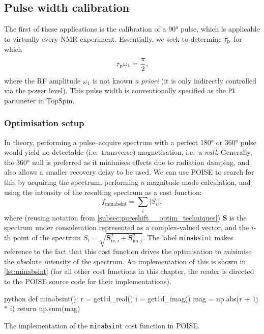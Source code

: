 \subsection{Pulse width calibration}
\label{subsec:poise__pulsecal}

The first of these applications is the calibration of a \ang{90} \proton{} pulse, which is applicable to virtually every NMR experiment.
Essentially, we seek to determine $\tau_\mathrm{p}$ for which
\begin{equation}
    \label{eq:pw90}
    \tau_\mathrm{p} \omega_1 = \frac{\pi}{2},
\end{equation}
where the RF amplitude $\omega_1$ is not known \textit{a priori} (it is only indirectly controlled via the power level).
This pulse width is conventionally specified as the \texttt{P1} parameter in TopSpin.

\subsubsection{Optimisation setup}

In theory, performing a pulse--acquire spectrum with a perfect \ang{180} or \ang{360} pulse would yield no detectable (i.e.\ transverse) magnetisation, i.e.\ a \textit{null}.
Generally, the \ang{360} null is preferred as it minimises effects due to radiation damping, and also allows a smaller recovery delay to be used.
We can use POISE to search for this by acquiring the spectrum, performing a magnitude-mode calculation, and using the intensity of the resulting spectrum as a cost function:
\begin{equation}
    \label{eq:minabsint}
    f_\mathrm{minabsint} = \sum_i |S_i|,
\end{equation}
where (reusing notation from \cref{subsec:pureshift__optim_techniques}) $\symbf{S}$ is the spectrum under consideration represented as a complex-valued vector, and the $i$-th point of the spectrum $S_i = \sqrt{\symbf{S}_{\text{re},i}^2 + \symbf{S}_{\text{im},i}^2}$.
The label \texttt{minabsint} makes reference to the fact that this cost function drives the optimisation to \textit{min}imise the \textit{abs}olute \textit{int}ensity of the spectrum.
An implementation of this is shown in \cref{lst:minabsint} (for all other cost functions in this chapter, the reader is directed to the POISE source code for their implementations).

\begin{mylisting}[htb]
\begin{tcbminted}{python}
def minabsint():
    r = get1d_real()
    i = get1d_imag()
    mag = np.abs(r + 1j * i)
    return np.sum(mag)
\end{tcbminted}
\caption[Implementation of \texttt{minabsint} cost function]{The implementation of the \texttt{minabsint} cost function in POISE.}
\label{lst:minabsint}
\end{mylisting}

